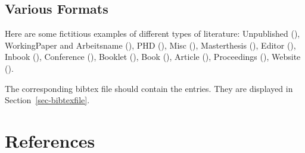 \documentclass[
  stu,
  floatsintext,
  longtable,
  a4paper,
  nolmodern,
  notxfonts,
  notimes,
  colorlinks=true,linkcolor=black,citecolor=black,urlcolor=black]{apa7}
\begin{document}
\subsection{Various Formats}

Here are some fictitious examples of different types of literature:
Unpublished (), WorkingPaper and
Arbeitsname (), PHD
(), Misc (),
Masterthesis (), Editor
(), Inbook
(), Conference
(), Booklet
(), Book (),
Article (), Proceedings
(), Website
().

The corresponding bibtex file should contain the entries. They are
displayed in Section~\ref{sec-bibtexfile}.

\clearpage

\section*{References}\label{references}
\end{document}
